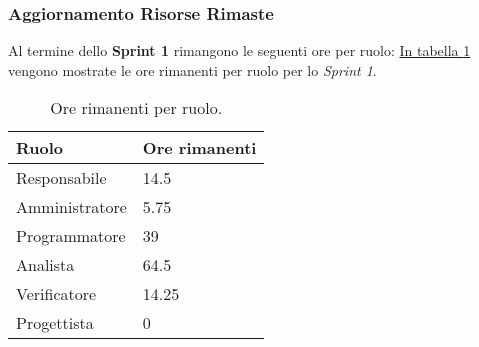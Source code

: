 \subsubsection{Aggiornamento Risorse Rimaste}
Al termine dello \textbf{Sprint 1} rimangono le seguenti ore per ruolo: \hyperref[tab:sprint1_ore_rimanenti]{In tabella \ref{tab:sprint1_ore_rimanenti}} vengono mostrate le ore rimanenti per ruolo per lo \textit{Sprint 1}.

\begin{table}[H]
    \centering
    \begin{tabular}{| l | l |}
    \hline
    \textbf{Ruolo} & 
    \textbf{Ore rimanenti}\\
    \hline
        Responsabile & 14.5\\
    \hline
        Amministratore & 5.75\\
    \hline
        Programmatore & 39\\
    \hline
        Analista & 64.5 \\
    \hline
        Verificatore & 14.25 \\
    \hline
        Progettista & 0 \\
    \hline
    \end{tabular}
    \caption{Ore rimanenti per ruolo.}
    \label{tab:sprint1_ore_rimanenti} 
\end{table}